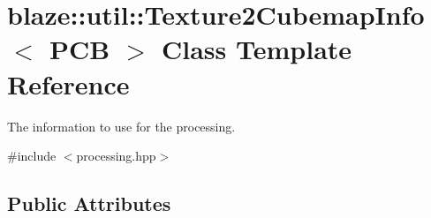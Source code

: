 \hypertarget{structblaze_1_1util_1_1Texture2CubemapInfo}{}\section{blaze\+:\+:util\+:\+:Texture2\+Cubemap\+Info$<$ P\+CB $>$ Class Template Reference}
\label{structblaze_1_1util_1_1Texture2CubemapInfo}


The information to use for the processing.  




{\ttfamily \#include $<$processing.\+hpp$>$}

\subsection*{Public Attributes}

